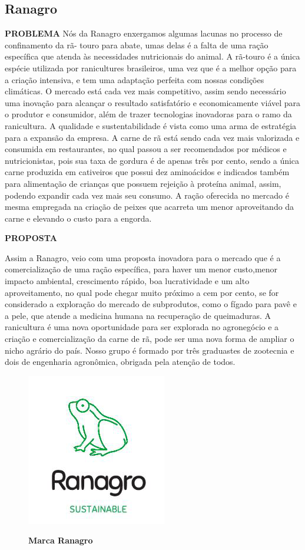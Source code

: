 \subsection{Ranagro}

\textbf{PROBLEMA}
Nós da Ranagro enxergamos algumas lacunas no processo de confinamento da rã- touro para abate, umas delas é a falta de uma ração específica que atenda às necessidades nutricionais do animal. A rã-touro é a única espécie utilizada por ranicultures brasileiros, uma vez que é a melhor opção para a criação intensiva, e tem uma adaptação perfeita com nossas condições climáticas. O mercado está cada vez mais competitivo, assim sendo necessário uma inovação para alcançar o resultado satisfatório e economicamente viável para o produtor e consumidor, além de trazer tecnologias inovadoras para o ramo da ranicultura. A qualidade e sustentabilidade é vista como uma arma de estratégia para a expansão da empresa. A carne de rã está sendo cada vez mais valorizada e consumida em restaurantes, no qual passou a ser recomendados por médicos e nutricionistas, pois sua taxa de gordura é de apenas três por cento, sendo a única carne produzida em cativeiros que possui dez aminoácidos e indicados também para alimentação de crianças que possuem rejeição à proteína animal, assim, podendo expandir cada vez mais seu consumo. A ração oferecida no mercado é mesma empregada na criação de peixes que acarreta um menor aproveitando da carne e elevando o custo para a engorda.

\textbf{PROPOSTA}

Assim a Ranagro, veio com uma proposta inovadora para o mercado que é a comercialização de uma ração específica, para haver um menor custo,menor impacto ambiental, crescimento rápido, boa lucratividade e um alto aproveitamento, no qual pode chegar muito próximo a cem por cento, se for considerado a exploração do mercado de subprodutos, como o fígado para pavê e a pele, que atende a medicina humana na recuperação de queimaduras. A ranicultura é uma nova oportunidade para ser explorada no agronegócio e a criação e comercialização da carne de rã, pode ser uma nova forma de ampliar o nicho agrário do país. Nosso grupo é formado por três graduastes de zootecnia e dois de engenharia agronômica, obrigada pela atenção de todos.



\begin{figure}[!htb]
\centering
\caption{\textbf{Marca Ranagro}}
\includegraphics[scale=0.7]{Imagens/ranagro.png}
\label{figura_26}
\end{figure}
\newpage


